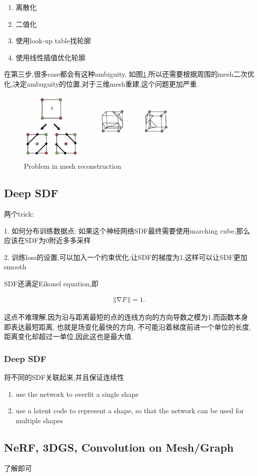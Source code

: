 \begin{enumerate}
    \item 离散化
    \item 二值化
    \item 使用look-up table找轮廓
    \item 使用线性插值优化轮廓
\end{enumerate}

在第三步,很多case都会有这种ambiguity, 如图\ref{fig:mesh reconstruction},所以还需要根据周围的mesh二次优化,决定ambuguity的位置,对于三维mesh重建,这个问题更加严重.

\begin{figure}[H]
    \centering
    \includegraphics[width=0.7\textwidth]{figures/holes.png}
    \caption{Problem in mesh reconstruction}
    \label{fig:mesh reconstruction}
\end{figure}

\subsection{Deep SDF}

两个trick:

1. 如何分布训练数据点: 如果这个神经网络SDF最终需要使用marching cube,那么应该在SDF为0附近多多采样

2. 训练loss的设置,可以加入一个约束优化:让SDF的梯度为1.这样可以让SDF更加smooth

SDF还满足Eikonel equation,即

\begin{equation}
    \left \Vert \nabla F \right \Vert = 1.
\end{equation}

这点不难理解,因为沿与距离最短的点的连线方向的方向导数之模为$1$,而函数本身即表达最短距离, 也就是场变化最快的方向,
不可能沿着梯度前进一个单位的长度,距离变化却超过一单位,因此这也是最大值.

\subsubsection{Deep SDF}

将不同的SDF关联起来,并且保证连续性\cite{Park2019CVPR}

\begin{enumerate}
    \item  use the network to overfit a single shape
    \item use a latent code to represent a shape, so that the
    network can be used for multiple shapes
\end{enumerate}

\subsection{NeRF, 3DGS, Convolution on Mesh/Graph}

了解即可